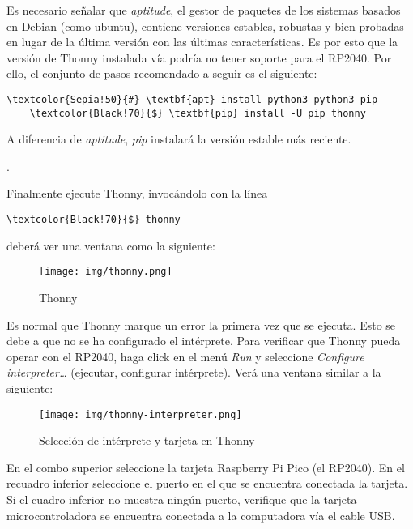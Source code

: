 Es necesario señalar que \emph{aptitude}, el gestor de paquetes de los sistemas basados en Debian (como ubuntu), contiene versiones estables, robustas y bien probadas en lugar de la última versión con las últimas características.
Es por esto que la versión de Thonny instalada vía  podría no tener soporte para el RP2040.
Por ello, el conjunto de pasos recomendado a seguir es el siguiente:

\begin{Verbatim}[commandchars=\\\{\},gobble=1]
	\textcolor{Sepia!50}{#} \textbf{apt} install python3 python3-pip
	\textcolor{Black!70}{$} \textbf{pip} install -U pip thonny
\end{Verbatim}

\noindent
A diferencia de \emph{aptitude}, \emph{pip} instalará la versión estable más reciente.

\medskip.

\noindent
Finalmente ejecute Thonny, invocándolo con la línea

\begin{Verbatim}[commandchars=\\\{\},gobble=1]
	\textcolor{Black!70}{$} thonny
\end{Verbatim}

\noindent
deberá ver una ventana como la siguiente:

\begin{figure}[H]
	\centering%
	\texttt{[image: img/thonny.png]} %
	\caption{Thonny}
	\label{fig:thonny} %
\end{figure}

Es normal que Thonny marque un error la primera vez que se ejecuta.
Esto se debe a que no se ha configurado el intérprete.
Para verificar que Thonny pueda operar con el RP2040, haga click en el menú \emph{Run} y seleccione \emph{Configure interpreter\dots} (ejecutar, configurar intérprete).
Verá una ventana similar a la siguiente:

\begin{figure}[H]
	\centering%
	\texttt{[image: img/thonny-interpreter.png]} %
	\caption{Selección de intérprete y tarjeta en Thonny}
	\label{fig:thonny-interpreter} %
\end{figure}

En el combo superior seleccione la tarjeta Raspberry Pi Pico (el RP2040).
En el recuadro inferior seleccione el puerto en el que se encuentra conectada la tarjeta.
Si el cuadro inferior no muestra ningún puerto, verifique que la tarjeta microcontroladora se encuentra conectada a la computadora vía el cable USB.
